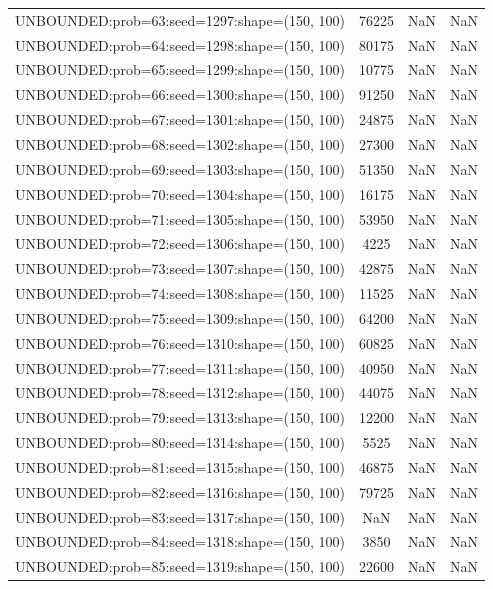 \begin{longtable}{lccc}
UNBOUNDED:prob=63:seed=1297:shape=(150, 100)  & 76225 &   NaN &    NaN \\
UNBOUNDED:prob=64:seed=1298:shape=(150, 100)  & 80175 &   NaN &    NaN \\
UNBOUNDED:prob=65:seed=1299:shape=(150, 100)  & 10775 &   NaN &    NaN \\
UNBOUNDED:prob=66:seed=1300:shape=(150, 100)  & 91250 &   NaN &    NaN \\
UNBOUNDED:prob=67:seed=1301:shape=(150, 100)  & 24875 &   NaN &    NaN \\
UNBOUNDED:prob=68:seed=1302:shape=(150, 100)  & 27300 &   NaN &    NaN \\
UNBOUNDED:prob=69:seed=1303:shape=(150, 100)  & 51350 &   NaN &    NaN \\
UNBOUNDED:prob=70:seed=1304:shape=(150, 100)  & 16175 &   NaN &    NaN \\
UNBOUNDED:prob=71:seed=1305:shape=(150, 100)  & 53950 &   NaN &    NaN \\
UNBOUNDED:prob=72:seed=1306:shape=(150, 100)  &  4225 &   NaN &    NaN \\
UNBOUNDED:prob=73:seed=1307:shape=(150, 100)  & 42875 &   NaN &    NaN \\
UNBOUNDED:prob=74:seed=1308:shape=(150, 100)  & 11525 &   NaN &    NaN \\
UNBOUNDED:prob=75:seed=1309:shape=(150, 100)  & 64200 &   NaN &    NaN \\
UNBOUNDED:prob=76:seed=1310:shape=(150, 100)  & 60825 &   NaN &    NaN \\
UNBOUNDED:prob=77:seed=1311:shape=(150, 100)  & 40950 &   NaN &    NaN \\
UNBOUNDED:prob=78:seed=1312:shape=(150, 100)  & 44075 &   NaN &    NaN \\
UNBOUNDED:prob=79:seed=1313:shape=(150, 100)  & 12200 &   NaN &    NaN \\
UNBOUNDED:prob=80:seed=1314:shape=(150, 100)  &  5525 &   NaN &    NaN \\
UNBOUNDED:prob=81:seed=1315:shape=(150, 100)  & 46875 &   NaN &    NaN \\
UNBOUNDED:prob=82:seed=1316:shape=(150, 100)  & 79725 &   NaN &    NaN \\
UNBOUNDED:prob=83:seed=1317:shape=(150, 100)  &   NaN &   NaN &    NaN \\
UNBOUNDED:prob=84:seed=1318:shape=(150, 100)  &  3850 &   NaN &    NaN \\
UNBOUNDED:prob=85:seed=1319:shape=(150, 100)  & 22600 &   NaN &    NaN \\

\end{longtable}

